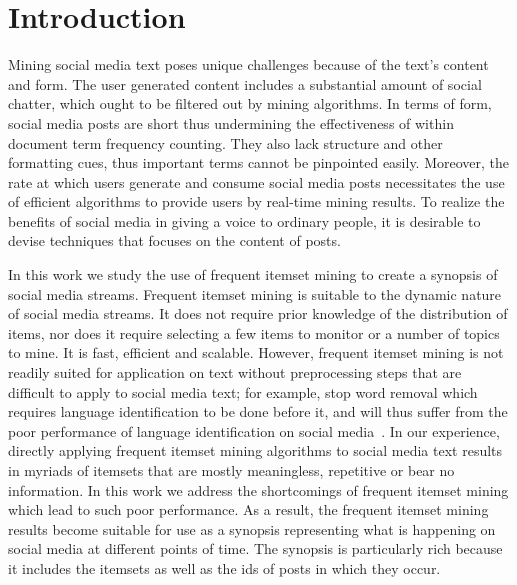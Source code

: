 \documentclass{sig-alternate}
\begin{document}

\newpage
\section{Introduction}

Mining social media text poses unique challenges
because of the text's content and form.
The user generated content includes a substantial 
amount of social chatter, 
which ought to be filtered out by mining algorithms.
In terms of form, social media posts are short thus
undermining the effectiveness of within document 
term frequency counting.
They also lack structure and other formatting cues,
thus important terms cannot be pinpointed easily. 
Moreover, the rate at which users generate and consume
social media posts necessitates the use of efficient algorithms
to provide users by real-time mining results.
To realize the benefits of social media in giving a voice to ordinary people,
it is desirable to devise techniques that focuses on the content of posts.

In this work we study the use of frequent itemset mining
to create a synopsis of social media streams. 
Frequent itemset mining is suitable to the dynamic nature of social media streams.
It does not require prior knowledge of the distribution of items,
nor does it require selecting a few items to monitor 
or a number of topics to mine. 
It is fast, efficient and scalable.
However, frequent itemset mining is not readily suited for application on text
without preprocessing steps that are difficult to apply to social media text;
for example, stop word removal which requires language identification
to be done before it, and will thus suffer from the poor performance
of language identification on social media~\cite{bergsma2012language}.
In our experience, directly applying frequent itemset mining algorithms
to social media text results in myriads of itemsets that are 
mostly meaningless, repetitive or bear no information.
In this work we address the shortcomings of 
frequent itemset mining which lead to such poor performance.
As a result, the frequent itemset mining results become
suitable for use as a synopsis representing what is happening
on social media at different points of time. 
The synopsis is particularly rich because it
includes the itemsets as well as the ids of posts in which they occur.
\end{document}
